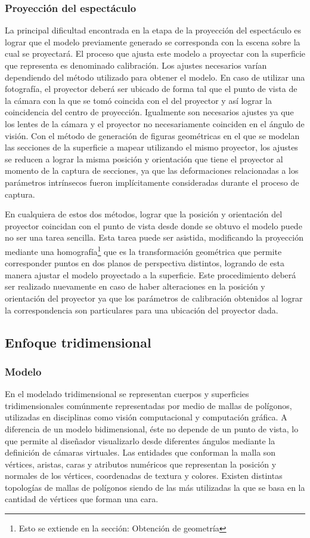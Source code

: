\subsubsection{Proyección del espectáculo}
La principal dificultad encontrada en la etapa de la proyección del espectáculo es lograr que el modelo previamente generado se corresponda con la escena sobre la cual se proyectará. El proceso que ajusta este modelo a proyectar con la superficie que representa es denominado calibración.
Los ajustes necesarios varían dependiendo del método utilizado para obtener el modelo. En caso de utilizar una fotografía, el proyector deberá ser ubicado de forma tal que el punto de vista de la cámara con la que se tomó coincida con el del proyector y así lograr la coincidencia del centro de proyección. Igualmente son necesarios ajustes ya que los lentes de la cámara y el proyector no necesariamente coinciden en el ángulo de visión.
Con el método de generación de figuras geométricas en el que se modelan las secciones de la superficie a mapear utilizando el mismo proyector, los ajustes se reducen a lograr la misma posición y orientación que tiene el proyector al momento de la captura de secciones, ya que las deformaciones relacionadas a los parámetros intrínsecos fueron implícitamente consideradas durante el proceso de captura.

En cualquiera de estos dos métodos, lograr que la posición y orientación del proyector coincidan con el punto de vista desde donde se obtuvo el modelo puede no ser una tarea sencilla. Esta tarea puede ser asistida, modificando la proyección mediante una homografía\footnote{Esto se extiende en la sección: Obtención de geometría} que es la transformación geométrica que permite corresponder puntos en dos planos de perspectiva distintos, logrando de esta manera ajustar el modelo proyectado a la superficie.
Este procedimiento deberá ser realizado nuevamente en caso de haber alteraciones en la posición y orientación del proyector ya que los parámetros de calibración obtenidos al lograr la correspondencia son particulares para una ubicación del proyector dada.

\subsection{Enfoque tridimensional}
\subsubsection{Modelo}
En el modelado tridimensional se representan cuerpos y superficies tridimensionales comúnmente representadas por medio de mallas de polígonos, utilizadas en disciplinas como visión computacional y computación gráfica. A diferencia de un modelo bidimensional, éste no depende de un punto de vista, lo que permite al diseñador visualizarlo desde diferentes ángulos mediante la definición de cámaras virtuales. Las entidades que conforman la malla son vértices, aristas, caras y atributos numéricos que representan la posición y normales de los vértices, coordenadas de textura y colores. Existen distintas topologías de mallas de polígonos siendo de las más utilizadas la que se basa en la cantidad de vértices que forman una cara.

